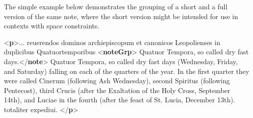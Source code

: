 The simple example below demonstrates the grouping of a short and a full version of the same note, where the short version might be intended for use in contexts with space constraints. \par\bgroup{}\exampleFont \begin{shaded}\noindent\mbox{}{<\textbf{p}>}... reuerendos dominos archiepiscopum et canonicos Leopolienses\mbox{}\newline 
 in duplicibus Quatuortemporibus\mbox{}\newline 
{<\textbf{noteGrp}>}\mbox{}\newline 
\hspace*{1em}Quatuor Tempora, so called dry fast days.{</\textbf{note}>}\mbox{}\newline 
\hspace*{1em}Quatuor Tempora, so called dry fast days (Wednesday, Friday, and Saturday)\mbox{}\newline 
\hspace*{1em}\hspace*{1em}\hspace*{1em}\hspace*{1em} falling on each of the quarters of the year. In the first quarter they were called Cinerum\mbox{}\newline 
\hspace*{1em}\hspace*{1em}\hspace*{1em}\hspace*{1em} (following Ash Wednesday), second Spiritus (following Pentecost), third Crucis\mbox{}\newline 
\hspace*{1em}\hspace*{1em}\hspace*{1em}\hspace*{1em} (after the Exaltation of the Holy Cross, September 14th), and Luciae\mbox{}\newline 
\hspace*{1em}\hspace*{1em}\hspace*{1em}\hspace*{1em} in the fourth (after the feast of St. Lucia, December 13th).\mbox{}\newline 
\hspace*{1em}\mbox{}\newline 
{}\mbox{}\newline 
 totaliter expediui.\mbox{}\newline 
{</\textbf{p}>}\end{shaded}\egroup\par 
